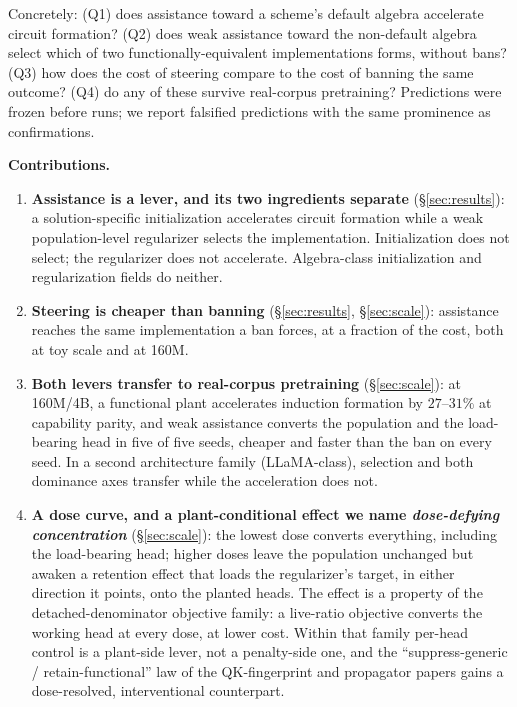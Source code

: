 \documentclass[11pt]{article}
\begin{document}
Concretely: (Q1) does assistance toward a scheme's default algebra accelerate circuit formation? (Q2) does
weak assistance toward the non-default algebra select which of two functionally-equivalent
implementations forms, without bans? (Q3) how does the cost of steering compare to the cost of banning the same
outcome? (Q4) do any of these survive real-corpus pretraining? Predictions were frozen before runs; we report
falsified predictions with the same prominence as confirmations.

\textbf{Contributions.}
\begin{enumerate}\itemsep1.5pt
\item \textbf{Assistance is a lever, and its two ingredients separate} (\S\ref{sec:results}): a solution-specific
initialization accelerates circuit formation while a weak population-level regularizer selects the
implementation. Initialization does not select; the regularizer does not accelerate. Algebra-class initialization
and regularization fields do neither.
\item \textbf{Steering is cheaper than banning} (\S\ref{sec:results}, \S\ref{sec:scale}): assistance reaches the
same implementation a ban forces, at a fraction of the cost, both at toy scale and at 160M.
\item \textbf{Both levers transfer to real-corpus pretraining} (\S\ref{sec:scale}): at 160M/4B, a functional plant
accelerates induction formation by $27$--$31\%$ at capability parity, and weak assistance converts the
population and the load-bearing head in five of five seeds, cheaper and faster than the ban on every seed. In a
second architecture family (LLaMA-class), selection and both dominance axes transfer while the acceleration does
not.
\item \textbf{A dose curve, and a plant-conditional effect we name \emph{dose-defying concentration}}
(\S\ref{sec:scale}): the lowest dose converts everything, including the load-bearing head; higher doses leave the
population unchanged but awaken a retention effect that loads the regularizer's target, in either direction it
points, onto the planted heads. The effect is a property of the detached-denominator objective family: a
live-ratio objective converts the working head at every dose, at lower cost. Within that family per-head control
is a plant-side lever, not a penalty-side one, and the ``suppress-generic / retain-functional'' law of the
QK-fingerprint and propagator papers gains a dose-resolved, interventional counterpart.
\end{enumerate}
\end{document}
